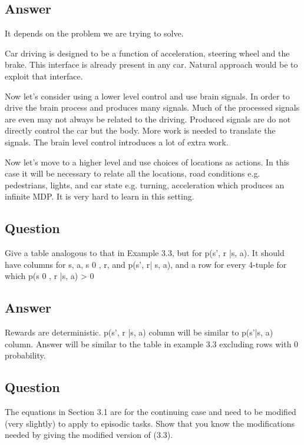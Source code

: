 \documentclass[11pt]{article}
\begin{document}
    \subsection*{Answer}
    It depends on the problem we are trying to solve.

    Car driving is designed to be a function of acceleration, steering wheel and the brake.
    This interface is already present in any car.
    Natural approach would be to exploit that interface.

    Now let's consider using a lower level control and use brain signals.
    In order to drive the brain process and produces many signals.
    Much of the processed signals are even may not always be related to the driving.
    Produced signals are do not directly control the car but the body.
    More work is needed to translate the signals.
    The brain level control introduces a lot of extra work.

    Now let's move to a higher level and use choices of locations as actions.
    In this case it will be necessary to relate all the locations, road conditions e.g. pedestrians, lights, and car state e.g. turning, acceleration which produces an infinite MDP.
    It is very hard to learn in this setting.

    \subsection{Question}

    Give a table analogous to that in Example 3.3, but for p(s', r |s, a).
    It should have columns for s, a, s 0 , r, and p(s', r| s, a), and a row for every 4-tuple for which p(s 0 , r |s, a) > 0

    \subsection*{Answer}

    Rewards are deterministic. p(s', r |s, a) column will be similar to p(s'|s, a) column.
    Answer will be similar to the table in example 3.3 excluding rows with 0 probability.

    \subsection{Question}

    The equations in Section 3.1 are for the continuing case and need to be modified (very slightly) to apply to episodic tasks.
    Show that you know the modifications needed by giving the modified version of (3.3).
\end{document}
